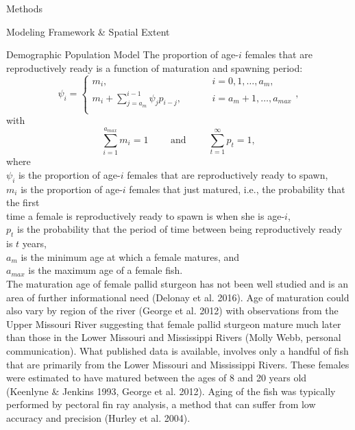 \documentclass[12pt]{article}
\begin{document}
\begin{section}{Methods}
\begin{subsection}{Modeling Framework \& Spatial Extent}
\begin{subsubsection}{Demographic Population Model}
\vspace{-6pt}The proportion of age-$i$ females that are reproductively ready is a function of maturation and spawning period:
\begin{equation}
\psi_i = \begin{cases}
m_i, & \hspace{1cm} i=0, 1, \ldots, a_m,\\
m_i + \sum_{j=a_{m}}^{i-1}\psi_{j}p_{i-j},  & \hspace{1cm} i=a_m+1, \ldots, a_{max}\\
\end{cases},
\label{psii}
\end{equation}
with
\begin{equation}
\sum_{i=1}^{a_{max}} m_i=1 \hspace{24pt} \mbox{ and } \hspace{24pt} \sum_{t=1}^{\infty} p_t =1,
\end{equation}
where\\ 
\hspace*{0.5cm}$\psi_i$ is the proportion of age-$i$ females that are reproductively ready to spawn,\\
\hspace*{0.5cm}$m_i$ is the proportion of age-$i$ females that just matured, i.e., the probability that the first\\ 
\hspace*{1.5cm}time a female is reproductively ready to spawn is when she is age-$i$,\\
\hspace*{0.5cm}$p_t$  is the probability that the period of time between being reproductively ready is $t$ years,\\
\hspace*{0.5cm}$a_m$ is the minimum age at which a female matures, and\\
\hspace*{0.5cm}$a_{max}$ is the maximum age of a female fish.\\


The maturation age of female pallid sturgeon has not been well studied and is an area of further informational need (Delonay et al. 2016).  Age of maturation could also vary by region of the river (George et al. 2012) with observations from the Upper Missouri River suggesting that female pallid sturgeon mature much later than those in the Lower Missouri and Mississippi Rivers (Molly Webb, personal communication).  What published data is available, involves only a handful of fish that are primarily from the Lower Missouri and Mississippi Rivers.   These females were estimated to have matured between the ages of 8 and 20 years old (Keenlyne \& Jenkins 1993, George et al. 2012).  Aging of the fish was typically performed by pectoral fin ray analysis, a method that can suffer from low accuracy and precision (Hurley et  al. 2004). 



\end{subsubsection}
\end{subsection}
\end{section}
\end{document}
